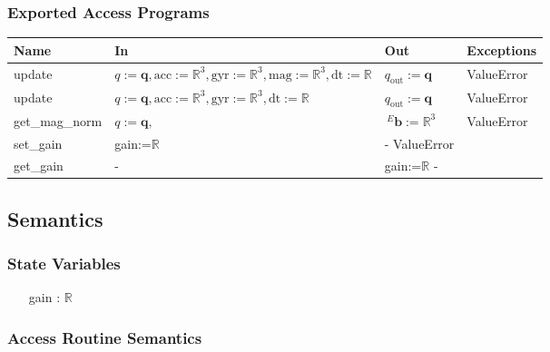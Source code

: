 \documentclass[12pt, titlepage]{article}
\begin{document}
\subsubsection{Exported Access Programs}

\begin{center}
\begin{tabular}{p{2.5cm} p{6cm} p{2cm} p{1.5cm}}
\hline
\textbf{Name} & \textbf{In} & \textbf{Out} & \textbf{Exceptions} \\
\hline
update & $q:=\mathbf{q}, \text{acc}:=\mathbb{R}^3, \text{gyr}:=\mathbb{R}^3,
\text{mag}:=\mathbb{R}^3, \text{dt}:=\mathbb{R}$ & $q_\text{out}:=\mathbf{q}$ & ValueError \\
update & $q:=\mathbf{q}, \text{acc}:=\mathbb{R}^3, \text{gyr}:=\mathbb{R}^3, \text{dt}:=\mathbb{R}$
& $q_\text{out}:=\mathbf{q}$ & ValueError \\
get\_mag\_norm & $q:=\mathbf{q}, $ & $\,^E\mathbf{b}:=\mathbb{R}^3$ & ValueError \\
set\_gain & gain:=$\mathbb{R}$ & - ValueError \\
get\_gain & - & gain:=$\mathbb{R}$ - \\
\hline
\end{tabular}
\end{center}

\subsection{Semantics}

\subsubsection{State Variables}
\begin{itemize}
  \item[gain] : $\mathbb{R}$
\end{itemize}

\subsubsection{Access Routine Semantics}
\end{document}

